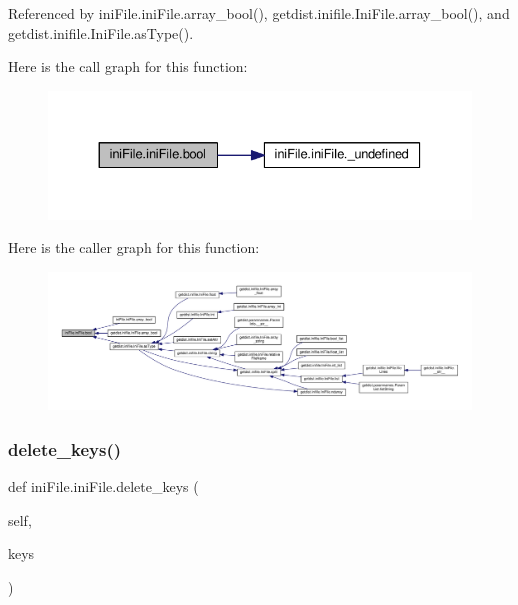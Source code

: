 Referenced by ini\+File.\+ini\+File.\+array\+\_\+bool(), getdist.\+inifile.\+Ini\+File.\+array\+\_\+bool(), and getdist.\+inifile.\+Ini\+File.\+as\+Type().

Here is the call graph for this function\+:
\nopagebreak
\begin{figure}[H]
\begin{center}
\leavevmode
\includegraphics[width=330pt]{classiniFile_1_1iniFile_a9b2217762990e4d84c0d5f4de5fdd276_cgraph}
\end{center}
\end{figure}
Here is the caller graph for this function\+:
\nopagebreak
\begin{figure}[H]
\begin{center}
\leavevmode
\includegraphics[width=350pt]{classiniFile_1_1iniFile_a9b2217762990e4d84c0d5f4de5fdd276_icgraph}
\end{center}
\end{figure}
\mbox{\label{classiniFile_1_1iniFile_a761fc1405e7d865552a70c15bf205201}} 
\subsubsection{\texorpdfstring{delete\+\_\+keys()}{delete\_keys()}}
{\footnotesize\ttfamily def ini\+File.\+ini\+File.\+delete\+\_\+keys (\begin{DoxyParamCaption}\item[{}]{self,  }\item[{}]{keys }\end{DoxyParamCaption})}



